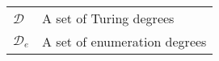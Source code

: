 \begin{abbreviations}


\begin{table}[here]
\centering
\begin{tabular}{ll}
$\mathcal{D}$  & A set of Turing degrees \\
$\mathcal{D}_e$ & A set of enumeration degrees \\
\end{tabular} 
\label{tbl:Abbreviations}
\end{table}


\end{abbreviations}
